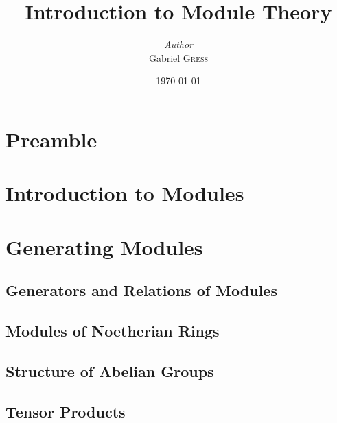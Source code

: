 \documentclass{memoir}
\institute{Rice University}
\title{Introduction to Module Theory}
\author{\textit{Author}\\Gabriel \textsc{Gress}}
\date{\today}
\begin{document}
\maketitle

\setcounter{chapter}{-1}
\chapter{Preamble}
\label{cha:preamble}



\chapter{Introduction to Modules}
\label{cha:introduction_to_modules}




\chapter{Generating Modules}
\label{cha:generating_modules}



\section{Generators and Relations of Modules}
\label{sec:generators_and_relations_of_modules}



\section{Modules of Noetherian Rings}
\label{sec:modules_of_Noetherian_rings}


\section{Structure of Abelian Groups}
\label{sec:structure_of_abelian_groups}



\section{Tensor Products}
\label{sec:tensors}
\end{document}
